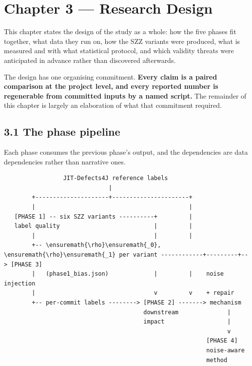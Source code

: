 \chapter{Chapter 3 --- Research Design}\label{chapter-3-research-design}

This chapter states the design of the study as a whole: how the five
phases fit together, what data they run on, how the SZZ variants were
produced, what is measured and with what statistical protocol, and which
validity threats were anticipated in advance rather than discovered
afterwards.

The design has one organising commitment. \textbf{Every claim is a
paired comparison at the project level, and every reported number is
regenerable from committed inputs by a named script.} The remainder of
this chapter is largely an elaboration of what that commitment required.

\section{3.1 The phase pipeline}\label{the-phase-pipeline}

Each phase consumes the previous phase's output, and the dependencies
are data dependencies rather than narrative ones.

\begin{verbatim}
                 JIT-Defects4J reference labels
                              |
        +---------------------+----------------------+
        |                                            |
   [PHASE 1] -- six SZZ variants ----------+         |
   label quality                           |         |
        |                                  |         |
        +-- \ensuremath{\rho}\ensuremath{_0}, \ensuremath{\rho}\ensuremath{_1} per variant ------------+---------+--> [PHASE 3]
        |   (phase1_bias.json)             |         |    noise injection
        |                                  v         v    + repair
        +-- per-commit labels --------> [PHASE 2] -------> mechanism
                                        downstream              |
                                        impact                  |
                                                                v
                                                          [PHASE 4]
                                                          noise-aware
                                                          method
\end{verbatim}

